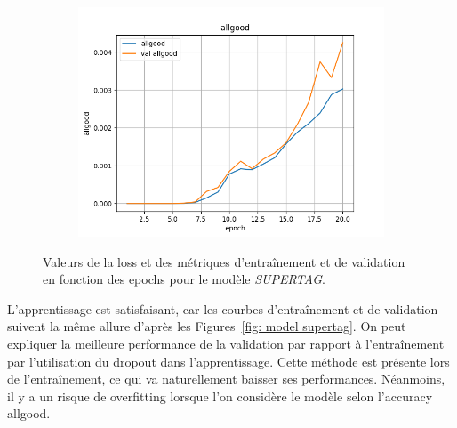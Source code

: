 \documentclass[a4paper]{article}
\begin{document}
\begin{figure}[H]
\begin{subfigure}{0.32\textwidth}
    \end{subfigure}
    \begin{subfigure}{0.32\textwidth}
        \centering
        \includegraphics[width=\linewidth]{../logs/supertag/allgood.png}
    \end{subfigure}
    \caption{Valeurs de la loss et des métriques d'entraînement et de validation en fonction des epochs 
            pour le modèle \textit{SUPERTAG}.}
    \label{fig: results supertag}
\end{figure}

L'apprentissage est satisfaisant, car les courbes d'entraînement et de validation suivent la même allure d'après les 
Figures~\ref{fig: model supertag}. 
On peut expliquer la meilleure performance
de la validation par rapport à l'entraînement par l'utilisation du dropout dans l'apprentissage. Cette méthode est présente lors
de l'entraînement, ce qui va naturellement baisser ses performances. 
Néanmoins, il y a un risque de overfitting lorsque l'on considère le modèle selon l'accuracy allgood. 
\end{document}
